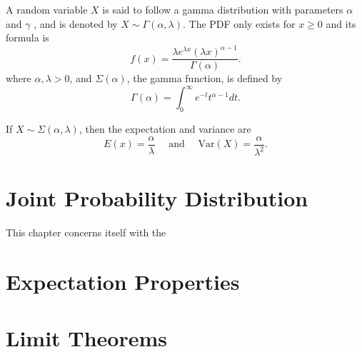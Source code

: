\documentclass[5pt, a4paper]{article}
\begin{document}
    \begin{tcolorbox}[title=Gamma Distribution]
         A random variable $X$ is said to follow a gamma distribution with
         parameters $\alpha$ and $\gamma$ , and is denoted by $X \sim 
         \Gamma(\alpha, \lambda )$. The PDF only exists for $x \ge  0$ and its
         formula is \[
             f(x) = \frac{\lambda e^{\lambda x}(\lambda x)^{\alpha -
             1}}{\Gamma(\alpha)}
         .\] 
         where $\alpha, \lambda > 0$, and $\Sigma (\alpha)$, the gamma function,
         is defined by \[
             \Gamma(\alpha) = \int_{0}^{\infty} e^{-t} t^{\alpha - 1} dt
         .\] 
    \end{tcolorbox}
    \begin{tcolorbox}[colframe=blue!20!white]
        If $X \sim \Sigma (\alpha, \lambda)$, then the expectation and variance
        are \[
        E(x) = \frac{\alpha}{\lambda} \quad \text{ and } \quad \text{Var}(X) =
        \frac{\alpha}{\lambda^2}
        .\] 
    \end{tcolorbox}
\section{Joint Probability Distribution}
    This chapter concerns itself with the 
    
\section{Expectation Properties}
\section{Limit Theorems}
\end{document}
